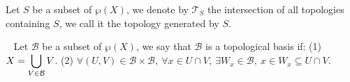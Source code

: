 \begin{definitionenv}
    Let $S$ be a subset of $\wp(X)$, we denote by $\mathscr{T}_S$ the intersection of all topologies containing $S$, we call it the topology generated by $S$. 
\end{definitionenv}
\begin{definitionenv}
    \ \newline
    Let $\mathcal{B}$ be a subset of $\wp(X)$, we say that $\mathcal{B}$ is a topological basis if:
    \newline
    (1) $\displaystyle X=\bigcup_{V\in \mathcal{B}}V$.
    \newline
    (2) $\forall (U,V)\in \mathcal{B}\times\mathcal{B},\ \forall x\in U\cap V,\ \exists W_x\in \mathcal{B},\ x\in W_x\subseteq U\cap V$.
\end{definitionenv}


